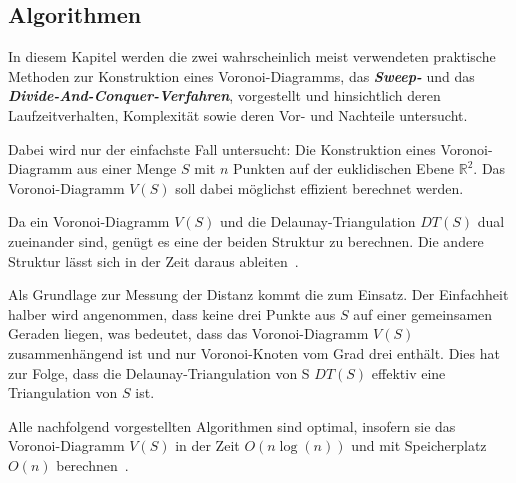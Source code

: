 \subsection{Algorithmen}
\label{sub:voronoiAlgorithms}
In diesem Kapitel werden die zwei wahrscheinlich meist verwendeten praktische Methoden zur Konstruktion eines Voronoi-Diagramms, das \textit{\textbf{Sweep-}} und das \textit{\textbf{Divide-And-Conquer-Verfahren}}, vorgestellt und hinsichtlich deren Laufzeitverhalten, Komplexität sowie deren Vor- und Nachteile untersucht.

Dabei wird nur der einfachste Fall untersucht: Die Konstruktion eines Voronoi-Diagramm aus einer Menge $S$ mit $n$ Punkten auf der euklidischen Ebene $\mathbb{R}^2$. Das Voronoi-Diagramm $V(S)$ soll dabei möglichst effizient berechnet werden.

Da ein Voronoi-Diagramm $V(S)$ und die Delaunay-Triangulation $DT(S)$ dual zueinander sind, genügt es eine der beiden Struktur zu berechnen. Die andere Struktur lässt
sich in der Zeit  daraus ableiten~\parencite[S. 232]{klein2005algorithmischegeometrie}.

Als Grundlage zur Messung der Distanz kommt die  zum Einsatz. Der Einfachheit halber wird angenommen, dass keine drei Punkte aus $S$ auf einer gemeinsamen Geraden liegen, was bedeutet, dass das Voronoi-Diagramm $V(S)$ zusammenhängend ist und nur Voronoi-Knoten vom Grad drei enthält. Dies hat zur Folge, dass die Delaunay-Triangulation von S $DT(S)$ effektiv eine Triangulation von $S$ ist.

Alle nachfolgend vorgestellten Algorithmen sind optimal, insofern sie das Voronoi-Diagramm $V(S)$ in der Zeit $O(n \log(n))$ und mit Speicherplatz $O(n)$ berechnen~\parencite[S. 269]{klein2005algorithmischegeometrie}.

\newpage{}


\newpage{}


